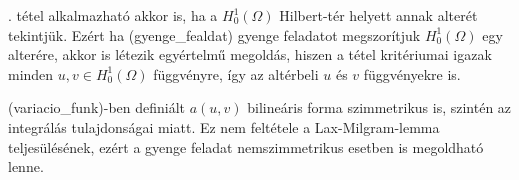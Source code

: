 \begin{remark}\label{LM_alter}
	. tétel alkalmazható akkor is, ha a $H_0^1({\Omega})$ Hilbert-tér helyett annak alterét tekintjük. Ezért ha \aref({gyenge_fealdat}) gyenge feladatot megszorítjuk  $H_0^1({\Omega})$ egy alterére, akkor is létezik egyértelmű megoldás, hiszen a tétel kritériumai igazak minden $u, v \in H_0^1({\Omega})$ függvényre, így az altérbeli $u$ és $v$ függvényekre is.
\end{remark}

\begin{remark}\label{szimm}
	\Aref({variacio_funk})-ben definiált $a(u,v)$ bilineáris forma szimmetrikus is, szintén az integrálás tulajdonságai miatt. Ez nem feltétele a Lax-Milgram-lemma teljesülésének, ezért a gyenge feladat nemszimmetrikus esetben is megoldható lenne.
\end{remark}

